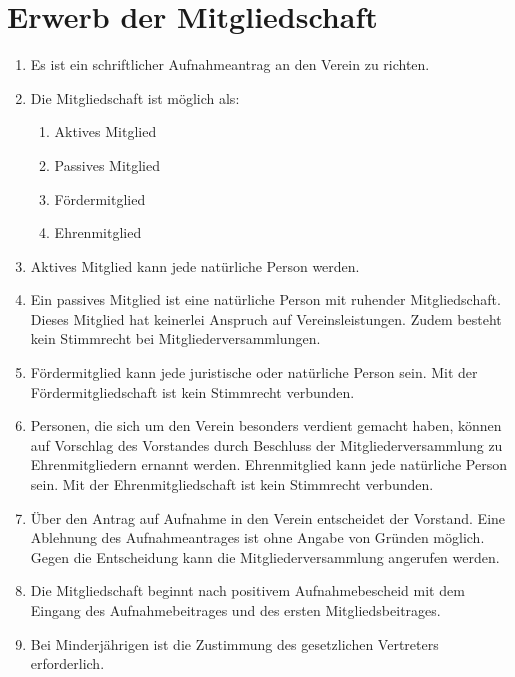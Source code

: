 \documentclass[a4paper,ngerman]{scrartcl}
\begin{document}
\section{Erwerb der Mitgliedschaft}
\begin{enumerate}
\item Es ist ein schriftlicher Aufnahmeantrag an den Verein zu richten.
\item Die Mitgliedschaft ist möglich als: 
\begin{enumerate}
\item Aktives Mitglied
\item Passives Mitglied
\item Fördermitglied
\item Ehrenmitglied
\end{enumerate}
\item Aktives Mitglied kann jede natürliche Person werden. 
\item Ein passives Mitglied ist eine natürliche Person mit ruhender Mitgliedschaft. Dieses Mitglied hat keinerlei Anspruch auf Vereinsleistungen. Zudem besteht kein Stimmrecht bei Mitgliederversammlungen.\label{passive Mitgliedschaft}
\item Fördermitglied kann jede juristische oder natürliche Person sein. Mit der Fördermitgliedschaft ist kein Stimmrecht verbunden.
\item 
Personen, die sich um den Verein besonders verdient gemacht haben, können auf Vorschlag des Vorstandes durch Beschluss der Mitgliederversammlung zu Ehrenmitgliedern ernannt werden.
Ehrenmitglied kann jede natürliche Person sein. Mit der Ehrenmitgliedschaft ist kein Stimmrecht verbunden.
\item Über den Antrag auf Aufnahme in den Verein entscheidet der Vorstand. Eine Ablehnung des Aufnahmeantrages ist ohne Angabe von Gründen möglich. Gegen die Entscheidung kann die Mitgliederversammlung angerufen werden.
\item Die Mitgliedschaft beginnt nach positivem Aufnahmebescheid mit dem Eingang des Aufnahmebeitrages und des ersten Mitgliedsbeitrages.
\item Bei Minderjährigen ist die Zustimmung des gesetzlichen Vertreters erforderlich.
\end{enumerate}
\end{document}
